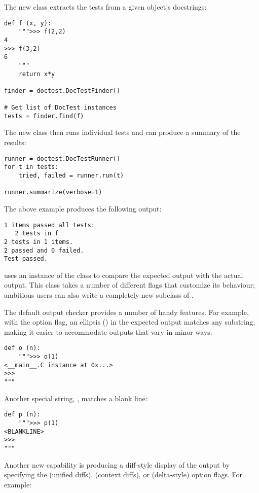 \documentclass{howto}
\begin{document}
The new  class extracts the tests from a given 
object's docstrings:

\begin{verbatim}
def f (x, y):
    """>>> f(2,2)
4
>>> f(3,2)
6
    """
    return x*y

finder = doctest.DocTestFinder()

# Get list of DocTest instances
tests = finder.find(f)
\end{verbatim}

The new  class then runs individual tests and can
produce a summary of the results:

\begin{verbatim}
runner = doctest.DocTestRunner()
for t in tests:
    tried, failed = runner.run(t)
    
runner.summarize(verbose=1)
\end{verbatim}

The above example produces the following output:

\begin{verbatim}
1 items passed all tests:
   2 tests in f
2 tests in 1 items.
2 passed and 0 failed.
Test passed.
\end{verbatim}

 uses an instance of the 
class to compare the expected output with the actual output.  This
class takes a number of different flags that customize its behaviour;
ambitious users can also write a completely new subclass of
.

The default output checker provides a number of handy features.
For example, with the  option flag,
an ellipsis () in the expected output matches any substring, 
making it easier to accommodate outputs that vary in minor ways:

\begin{verbatim}
def o (n):
    """>>> o(1)
<__main__.C instance at 0x...>
>>>
"""
\end{verbatim}

Another special string, , matches a blank line:

\begin{verbatim}
def p (n):
    """>>> p(1)
<BLANKLINE>
>>>
"""
\end{verbatim}

Another new capability is producing a diff-style display of the output
by specifying the  (unified diffs),
 (context diffs), or
 (delta-style) option flags.  For example:
\end{document}
